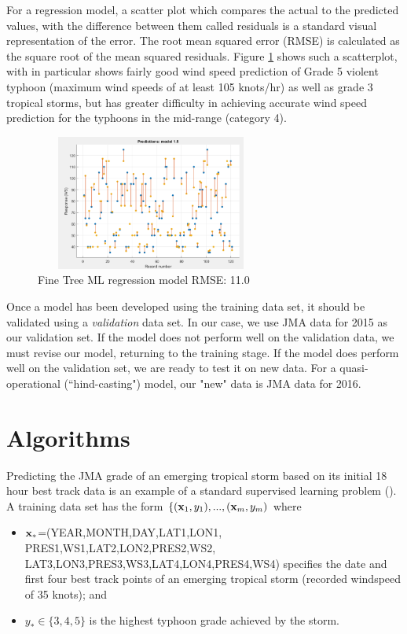 \documentclass{SBCbookchapter}
\begin{document}
	
	For a regression model, a scatter plot which compares the actual to the predicted values, with the difference between them called residuals is a standard visual representation of the error. The root mean squared error (RMSE) is calculated as the square root of the mean squared residuals. Figure \ref{FineTreeRegression} shows such a scatterplot, with in particular shows fairly good wind speed prediction of Grade 5 violent typhoon (maximum wind speeds of at least 105 knots/hr) as well as grade 3 tropical storms, but has greater difficulty in achieving accurate wind speed prediction for the typhoons in the mid-range (category 4).
	
	\begin{figure}[!htpb]
		\centering
		\includegraphics[width=3in,height=1.75in]{TyphoonCM2.png}
		\caption{Fine Tree ML regression model RMSE: 11.0 }
		\label{FineTreeRegression}
	\end{figure}
	
	
	
	Once a model has been developed using the training data set, it should be validated using a \emph{validation} data set. In our case, we use JMA data for 2015  as our validation set.  If the model does not perform well on the validation data, we must revise our model, returning to the training stage.  If the model does perform well on the validation set, we are ready to test it on new data. For a quasi-operational (``hind-casting") model, our "new" data is JMA data for 2016.
	
	\section{Algorithms}
	
	Predicting the JMA grade of an emerging tropical storm based on its initial 18 hour best track data is an example of a standard supervised learning problem (\cite{Diet}). A training data set has the form $\{({\bf x}_1,y_1),...,({\bf x}_m,y_m)$  where 
	\begin{itemize}
		\item ${\bf x_*}$=(YEAR,MONTH,DAY,LAT1,LON1,
		PRES1,WS1,LAT2,LON2,PRES2,WS2,\\LAT3,LON3,PRES3,WS3,LAT4,LON4,PRES4,WS4) specifies the date and first four best track points of an emerging tropical storm (recorded windspeed of 35 knots); and 
		\item $y_*\in\{3,4,5\}$ is the highest typhoon grade achieved by the storm. 
	\end{itemize}
	
\end{document}
